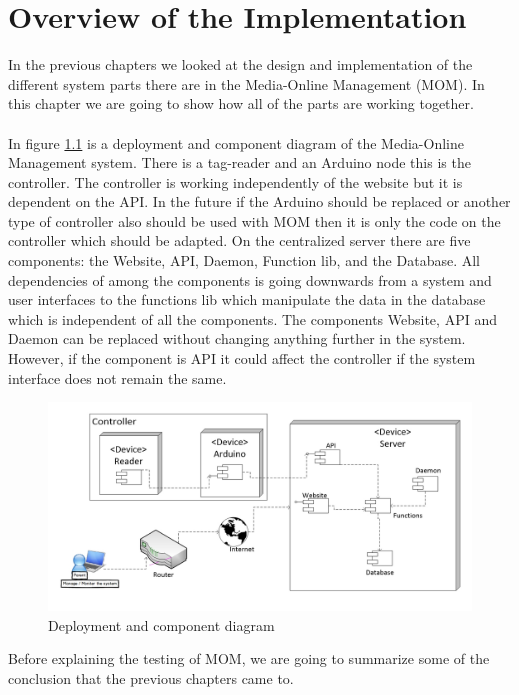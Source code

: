 \chapter{Overview of the Implementation}

In the previous chapters we looked at the design and implementation of the different system parts there are in the Media-Online Management (MOM).
In this chapter we are going to show how all of the parts are working together.\\
\\
In figure \ref{fig:deployment} is a deployment and component diagram of the Media-Online Management system. There is a tag-reader and an Arduino node this is the controller. The controller is working independently of the website but it is dependent on the API. In the future if the Arduino should be replaced or another type of controller also should be used with MOM then it is only the code on the controller which should be adapted. 
On the centralized server there are five components: the Website, API, Daemon, Function lib, and the Database. All dependencies of among the components is going downwards from a system and user interfaces to the functions lib which manipulate the data in the database which is independent of all the components.
 The components Website, API and Daemon can be replaced without changing anything further in the system. However, if the component is API it could affect the controller if the system interface does not remain the same.
    
\begin{figure}
	\centering
		\includegraphics[width=1.50\textwidth, angle=90 ]{images/deployment.jpg}
	\caption{Deployment and component diagram}
	\label{fig:deployment}
\end{figure}


Before explaining the testing of MOM, we are going to summarize some of the conclusion that the previous chapters came to.


